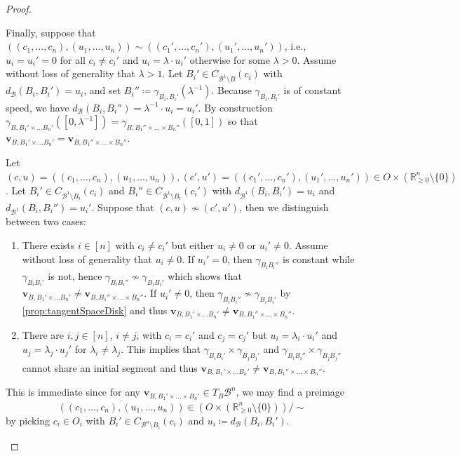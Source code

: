 \documentclass[10pt]{article}
\theoremstyle{definition}
\newcommand{\RR}{\mathbb{R}}
\renewcommand{\vec}[1]{\mathbf{#1}}
\begin{document}
\begin{proof}
\begin{description}
    Finally, suppose that $((c_1,\dots,c_n),(u_1,\dots,u_n))\sim ((c_1',\dots,c_n'),(u_1',\dots,u_n'))$, i.e., $u_i = u_i' = 0$ for all $c_i \neq c_i'$ and $u_i = \lambda\cdot u_i'$ otherwise for some $\lambda>0$.  Assume without loss of generality that $\lambda>1$. Let $B_i'\in C_{\mathcal B^1\setminus B}(c_i)$ with $d_{\mathcal B}(B_i,B_i')=u_i$, and set $B_i''\coloneqq \gamma_{B_i,B_i'}(\lambda^{-1})$.  Because $\gamma_{B_i,B_i'}$ is of constant speed, we have $d_{\mathcal B}(B_i,B_i'')=\lambda^{-1}\cdot u_i=u_i'$.  By construction $\gamma_{B,B_1'\times\dots B_n'}([0,\lambda^{-1}])=\gamma_{B,B_1''\times \dots \times B_n''}([0,1])$ so that $\vec{v}_{B,B_1'\times\dots B_n'}=\vec{v}_{B,B_1''\times \dots \times B_n''}$.
  \item[\textbf{$\varphi$ is injective:}]  Let $(c,u)=((c_1,\dots,c_n),(u_1,\dots,u_n)), (c',u')=((c_1',\dots,c_n'),(u_1',\dots,u_n'))\in O\times (\RR_{\geq 0}^n\setminus\{0\})$.  Let $B_i'\in C_{\mathcal B^1\setminus B_i}(c_i)$ and $B_i''\in C_{\mathcal B^1\setminus B_i}(c_i')$ with $d_{\mathcal B^1}(B_i,B_i')=u_i$ and $d_{\mathcal B^1}(B_i,B_i'')=u_i'$.  Suppose that $(c,u)\not\sim (c',u')$, then we distinguish between two cases:
    \begin{enumerate}
    \item[(i)] There exists $i\in [n]$ with $c_i\neq c_i'$ but either $u_i\neq 0$ or $u_i'\neq 0$.  Assume without loss of generality that $u_i\neq 0$.  If $u_i'=0$, then $\gamma_{B_iB_i''}$ is constant while $\gamma_{B_iB_i'}$ is not, hence $\gamma_{B_iB_i''}\not\sim\gamma_{B_iB_i'}$ which shows that $\vec{v}_{B,B_1'\times\dots B_n'}\neq \vec{v}_{B,B_1''\times \dots \times B_n''}$.  If $u_i'\neq 0$, then $\gamma_{B_iB_i''}\not\sim\gamma_{B_iB_i'}$ by \cref{prop:tangentSpaceDisk} and thus $\vec{v}_{B,B_1'\times\dots B_n'}\neq \vec{v}_{B,B_1''\times \dots \times B_n''}$.
    \item[(ii)] There are $i,j\in [n]$, $i\neq j$, with $c_i=c_i'$ and $c_j=c_j'$ but $u_i=\lambda_i\cdot u_i'$ and $u_j=\lambda_j\cdot u_j'$ for $\lambda_i\neq \lambda_j$.  This implies that $\gamma_{B_iB_i'}\times \gamma_{B_jB_j'}$ and $\gamma_{B_iB_i''}\times \gamma_{B_jB_j''}$ cannot share an initial segment and thus $\vec{v}_{B,B_1'\times\dots B_n'}\neq \vec{v}_{B,B_1''\times \dots \times B_n''}$.
    \end{enumerate}
  \item[\textbf{$\varphi$ is surjective:}] This is immediate since for any $\vec{v}_{B,B_1'\times\dots\times B_n'}\in T_B\mathcal B^n$, we may find a preimage $$\overline{((c_1,\dots,c_n),(u_1,\dots,u_n))}\in (O\times (\mathbb{R}_{\geq0}^n\setminus\{0\})) / \sim$$ by picking $c_i\in O_i$ with $B_i'\in C_{\mathcal B^n\setminus B_i}(c_i)$ and $u_i\coloneqq d_{\mathcal B}(B_i,B_i')$. \qedhere
  \end{description}
\end{proof}
\end{document}
